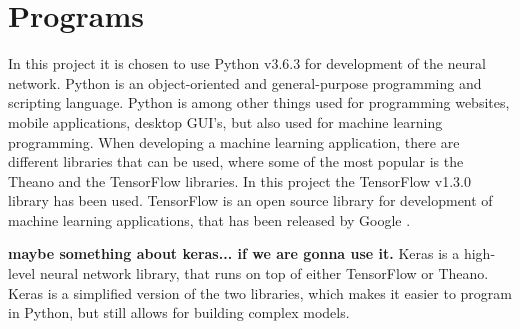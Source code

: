 \section{Programs}

In this project it is chosen to use Python v3.6.3 for development of the neural network.  
Python is an object-oriented and general-purpose programming and scripting language. Python is among other things used for programming websites, mobile applications, desktop GUI's, but also used for machine learning programming.
When developing a machine learning application, there are different libraries that can be used, where some of the most popular is the Theano and the TensorFlow libraries.\citep{Swamynathan2017}
\noindent
In this project the TensorFlow v1.3.0 library has been used. 
TensorFlow is an open source library for development of machine learning applications, that has been released by Google \citep{Swamynathan2017}. 


\textbf{maybe something about keras... if we are gonna use it.  }
\noindent
Keras is a high-level neural network library, that runs on top of either TensorFlow or Theano. Keras is a simplified version of the two libraries, which makes it easier to program in Python, but still allows for building complex models.\citep{Swamynathan2017}  
